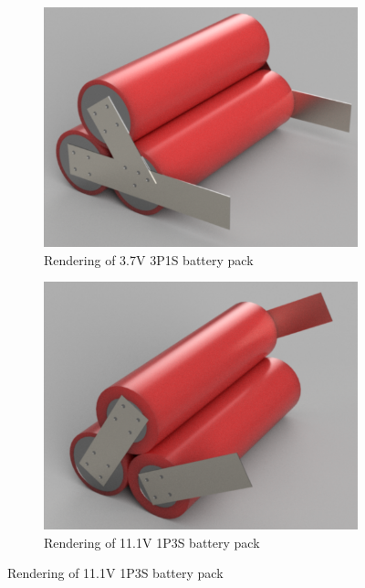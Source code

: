 \documentclass{article}
\begin{document}
\begin{figure}[H]
\centering

\begin{subfigure}{0.45\textwidth}
\includegraphics[width=\textwidth]{images/3p1s-battery-pack-render.png}
\caption{Rendering of 3.7V 3P1S battery pack}
\label {fig:parallel-pack}
\end{subfigure}
\hfill
\begin{subfigure}{0.45\textwidth}
\includegraphics[width=\textwidth]{images/1p3s-battery-pack-render.png}
\caption{Rendering of 11.1V 1P3S battery pack}
\label {fig:series-pack}
\end{subfigure}

\end{figure}
\end{document}
